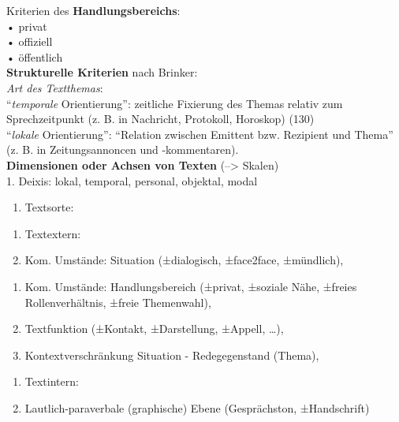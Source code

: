 \documentclass[
  letterpaper,
]{scrbook}
\providecommand{\tightlist}{%
  \setlength{\itemsep}{0pt}\setlength{\parskip}{0pt}}\usepackage{longtable,booktabs,array}
\begin{document}
Kriterien des \textbf{Handlungsbereichs}:\\
• privat\\
• offiziell\\
• öffentlich\\

\textbf{Strukturelle Kriterien} nach Brinker:\\
\emph{Art des Textthemas}:\\
``\emph{temporale} Orientierung'': zeitliche Fixierung des Themas
relativ zum Sprechzeitpunkt (z. B. in Nachricht, Protokoll, Horoskop)
(130)\\
``\emph{lokale} Orientierung'': ``Relation zwischen Emittent bzw.
Rezipient und Thema'' (z. B. in Zeitungsannoncen und -kommentaren).\\

\textbf{Dimensionen oder Achsen von Texten} (--\textgreater{} Skalen)\\
1. Deixis: lokal, temporal, personal, objektal, modal\\

\begin{enumerate}
\def\labelenumi{\arabic{enumi}.}
\setcounter{enumi}{1}
\tightlist
\item
  Textsorte:\\
\end{enumerate}

\begin{enumerate}
\def\labelenumi{\alph{enumi}.}
\tightlist
\item
  Textextern:\\
\item
  Kom. Umstände: Situation (±dialogisch, ±face2face, ±mündlich),\\
\end{enumerate}

\begin{enumerate}
\def\labelenumi{\roman{enumi}.}
\setcounter{enumi}{1}
\tightlist
\item
  Kom. Umstände: Handlungsbereich (±privat, ±soziale Nähe, ±freies
  Rollenverhältnis, ±freie Themenwahl),\\
\item
  Textfunktion (±Kontakt, ±Darstellung, ±Appell, \ldots),\\
\item
  Kontextverschränkung Situation - Redegegenstand (Thema),\\
\end{enumerate}

\begin{enumerate}
\def\labelenumi{\alph{enumi}.}
\setcounter{enumi}{1}
\tightlist
\item
  Textintern:\\
\item
  Lautlich-paraverbale (graphische) Ebene (Gesprächston, ±Handschrift)\\
\end{enumerate}
\end{document}
